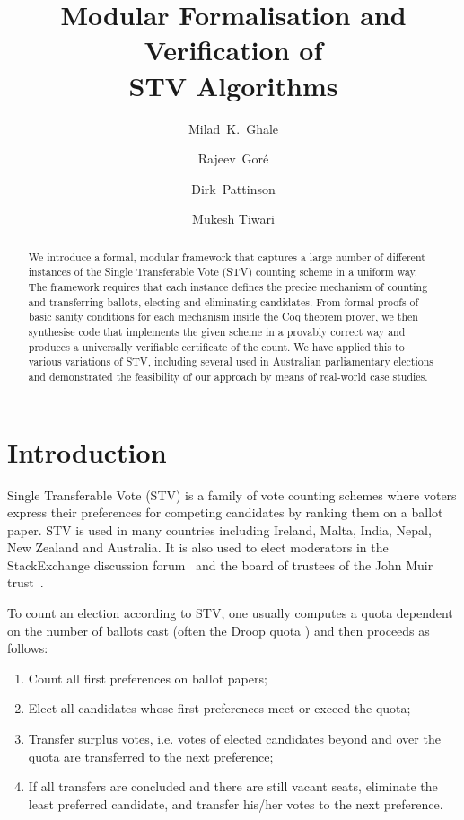 \documentclass{llncs}
\title{Modular Formalisation and Verification of \\STV Algorithms}
\author{Milad~K.~Ghale\and
        Rajeev~Gor\'e\and
        Dirk~Pattinson\and
        Mukesh Tiwari}
\institute{The Australian National University}
\begin{document}
\maketitle
\pagestyle{plain}
\thispagestyle{empty}
\begin{abstract}
We introduce a formal, modular framework that captures a large number of
different instances of the Single Transferable Vote (STV) counting
scheme in a uniform way. The framework requires that each instance
defines the precise mechanism of counting and transferring ballots,
electing and eliminating candidates. From formal proofs of basic
sanity conditions for each mechanism inside the Coq theorem prover, we then synthesise
code that implements the given scheme in a provably correct way and
produces a universally verifiable certificate of the count. We have
applied this to various variations of STV, including several  used in Australian
parliamentary elections and demonstrated the feasibility of our
approach by means of real-world case studies.
\end{abstract}

\section{Introduction}
 Single Transferable Vote (STV) is a family of 
 vote counting schemes where voters express their 
 preferences for competing candidates by ranking them on a ballot
 paper. STV is used
in many 
 countries including Ireland, Malta, India, Nepal, New Zealand and
 Australia. It is also used to elect moderators in the
 StackExchange discussion forum~\cite{StackExchange:2018:ME} and the
 board of trustees of the John Muir trust~\cite{Trust:2018:AT}. 

 To count an election according to STV, one usually computes a quota
 dependent on the number of ballots cast (often the Droop quota
 \cite{Droop:1881:MER}) and then proceeds as follows:
 \begin{enumerate}
 \item Count all first preferences on ballot papers;
 \item Elect all candidates whose first preferences meet or exceed the
 quota;
 \item Transfer surplus votes, i.e. votes of elected candidates beyond and
 over the quota are transferred to the next preference;
 \item If all transfers are concluded and there are still vacant
 seats, eliminate the least preferred candidate, and transfer his/her  votes
 to the next preference.
 \end{enumerate}
\end{document}
